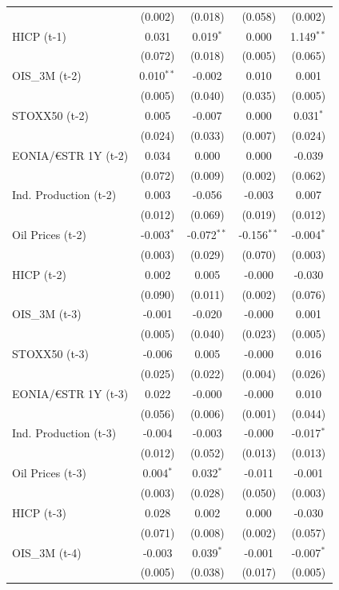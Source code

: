 \begin{longtable}[t]{lcccc}
 & (0.002) & (0.018) & (0.058) & (0.002)\\
HICP (t-1) & 0.031 & 0.019$^{*}$ & 0.000 & 1.149$^{**}$\\
 & (0.072) & (0.018) & (0.005) & (0.065)\\
OIS\_3M (t-2) & 0.010$^{**}$ & -0.002 & 0.010 & 0.001\\
 & (0.005) & (0.040) & (0.035) & (0.005)\\
STOXX50 (t-2) & 0.005 & -0.007 & 0.000 & 0.031$^{*}$\\
 & (0.024) & (0.033) & (0.007) & (0.024)\\
EONIA/€STR 1Y (t-2) & 0.034 & 0.000 & 0.000 & -0.039\\
 & (0.072) & (0.009) & (0.002) & (0.062)\\
Ind. Production (t-2) & 0.003 & -0.056 & -0.003 & 0.007\\
 & (0.012) & (0.069) & (0.019) & (0.012)\\
Oil Prices (t-2) & -0.003$^{*}$ & -0.072$^{**}$ & -0.156$^{**}$ & -0.004$^{*}$\\
 & (0.003) & (0.029) & (0.070) & (0.003)\\
HICP (t-2) & 0.002 & 0.005 & -0.000 & -0.030\\
 & (0.090) & (0.011) & (0.002) & (0.076)\\
OIS\_3M (t-3) & -0.001 & -0.020 & -0.000 & 0.001\\
 & (0.005) & (0.040) & (0.023) & (0.005)\\
STOXX50 (t-3) & -0.006 & 0.005 & -0.000 & 0.016\\
 & (0.025) & (0.022) & (0.004) & (0.026)\\
EONIA/€STR 1Y (t-3) & 0.022 & -0.000 & -0.000 & 0.010\\
 & (0.056) & (0.006) & (0.001) & (0.044)\\
Ind. Production (t-3) & -0.004 & -0.003 & -0.000 & -0.017$^{*}$\\
 & (0.012) & (0.052) & (0.013) & (0.013)\\
Oil Prices (t-3) & 0.004$^{*}$ & 0.032$^{*}$ & -0.011 & -0.001\\
 & (0.003) & (0.028) & (0.050) & (0.003)\\
HICP (t-3) & 0.028 & 0.002 & 0.000 & -0.030\\
 & (0.071) & (0.008) & (0.002) & (0.057)\\
OIS\_3M (t-4) & -0.003 & 0.039$^{*}$ & -0.001 & -0.007$^{*}$\\
 & (0.005) & (0.038) & (0.017) & (0.005)\\

\end{longtable}
